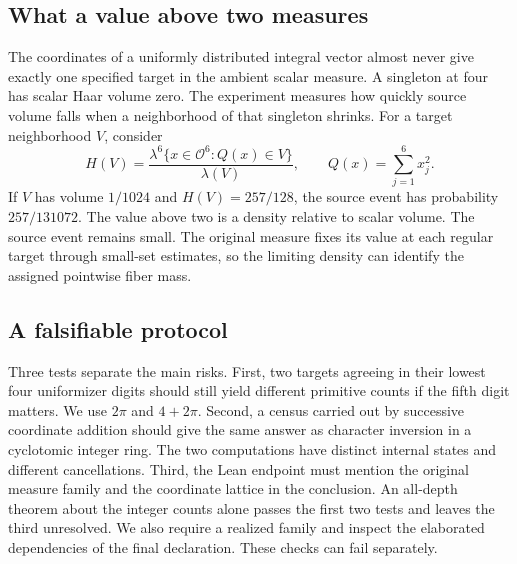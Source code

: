 \documentclass[12pt,letterpaper]{article}
\begin{document}
\subsection{What a value above two measures}
The coordinates of a uniformly distributed integral vector almost never give exactly one specified target in the ambient scalar measure. A singleton at four has scalar Haar volume zero. The experiment measures how quickly source volume falls when a neighborhood of that singleton shrinks. For a target neighborhood $V$, consider
\[
 H(V)=\frac{\lambda^6\{x\in\mathcal O^6:Q(x)\in V\}}{\lambda(V)},\qquad Q(x)=\sum_{j=1}^6x_j^2.
\]
If $V$ has volume $1/1024$ and $H(V)=257/128$, the source event has probability $257/131072$. The value above two is a density relative to scalar volume. The source event remains small. The original measure fixes its value at each regular target through small-set estimates, so the limiting density can identify the assigned pointwise fiber mass.
\subsection{A falsifiable protocol}
Three tests separate the main risks. First, two targets agreeing in their lowest four uniformizer digits should still yield different primitive counts if the fifth digit matters. We use $2\pi$ and $4+2\pi$. Second, a census carried out by successive coordinate addition should give the same answer as character inversion in a cyclotomic integer ring. The two computations have distinct internal states and different cancellations. Third, the Lean endpoint must mention the original measure family and the coordinate lattice in the conclusion. An all-depth theorem about the integer counts alone passes the first two tests and leaves the third unresolved. We also require a realized family and inspect the elaborated dependencies of the final declaration. These checks can fail separately.
\end{document}
